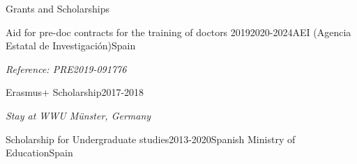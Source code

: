 \documentclass{resume} %
\newcommand{\italicitem}[1]{\item{\textit{#1}}}
\newcommand{\plainitem}[1]{\item{#1}}
\begin{document}
%
%
%
%
%

\begin{rSection}{Grants and Scholarships}
    \begin{rSubsectionNoBullet}{Aid for pre-doc contracts for the training of doctors 2019}{2020-2024}{AEI (Agencia Estatal de Investigaci\'on)}{Spain}
        \italicitem {Reference: PRE2019-091776}
    \end{rSubsectionNoBullet}
    \begin{rSubsectionNoBullet}{Erasmus+ Scholarship}{2017-2018}{}{}
       \vspace{-.3cm} \italicitem {Stay at WWU M\"unster, Germany}
    \end{rSubsectionNoBullet}
    \begin{rSubsectionNoBullet}{Scholarship for Undergraduate studies}{2013-2020}{Spanish Ministry of Education}{Spain}
        \italicitem {\vspace{-.3cm}}
    \end{rSubsectionNoBullet}
\end{rSection}
\end{document}
